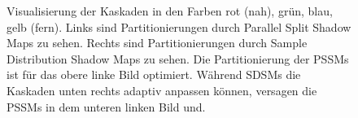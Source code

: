 \documentclass[runningheaders,a4paper]{llncs}
\begin{document}
\begin{figure}[H]
	\centering
	
	
	\caption{
		Visualisierung der Kaskaden in den Farben rot (nah), grün, blau, gelb (fern).
		Links sind Partitionierungen durch Parallel Split Shadow Maps zu sehen.
		Rechts sind Partitionierungen durch Sample Distribution Shadow Maps zu sehen.
		Die Partitionierung der PSSMs ist für das obere linke Bild optimiert.
		Während SDSMs die Kaskaden unten rechts adaptiv anpassen können, versagen die PSSMs in dem unteren linken Bild und.
	}
\end{figure}
\end{document}
